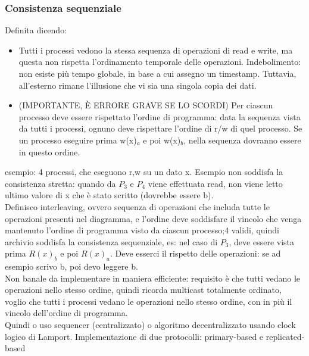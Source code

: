 \documentclass[16px]{article}
\begin{document}
\subsubsection{Consistenza sequenziale}
Definita dicendo:
\begin{itemize}
\item Tutti i processi vedono la stessa sequenza di operazioni di read e write, ma questa non rispetta l'ordinamento temporale delle operazioni. Indebolimento: non esiste più tempo globale, in base a cui assegno un timestamp. Tuttavia, all'esterno rimane l'illusione che vi sia una singola copia dei dati.
\item (IMPORTANTE, È ERRORE GRAVE SE LO SCORDI) Per ciascun processo deve essere rispettato l'ordine di programma: data la sequenza vista da tutti i processi, ognuno deve rispettare l'ordine di r/w di quel processo. Se un processo eseguire prima w(x)$_a$ e poi w(x)$_b$, nella sequenza dovranno essere in questo ordine.
\end{itemize}
esempio: 4 processi, che eseguono r,w su un dato x. Esempio non soddisfa la consistenza stretta: quando da $P_3$ e $P_4$ viene effettuata read, non viene letto ultimo valore di x che è stato scritto (dovrebbe essere b).\\ Definisco interleaving, ovvero sequenza di operazioni che includa tutte le operazioni presenti nel diagramma, e l'ordine deve soddisfare il vincolo che venga mantenuto l'ordine di programma visto da ciascun processo;4 validi, quindi archivio soddisfa la consistenza sequenziale, es: nel caso di $P_3$, deve essere vista prima $R(x)_b$ e poi $R(x)_a$. Deve esserci il rispetto delle operazioni: se ad esempio scrivo b, poi devo leggere b.\\ Non banale da implementare in maniera efficiente: requisito è che tutti vedano le operazioni nello stesso ordine, quindi ricorda multicast totalmente ordinato, voglio che tutti i processi vedano le operazioni nello stesso ordine, con in più il vincolo dell'ordine di programma.\\ Quindi o uso sequencer (centralizzato) o algoritmo decentralizzato usando clock logico di Lamport. Implementazione di due protocolli: primary-based e replicated-based 
\end{document}
